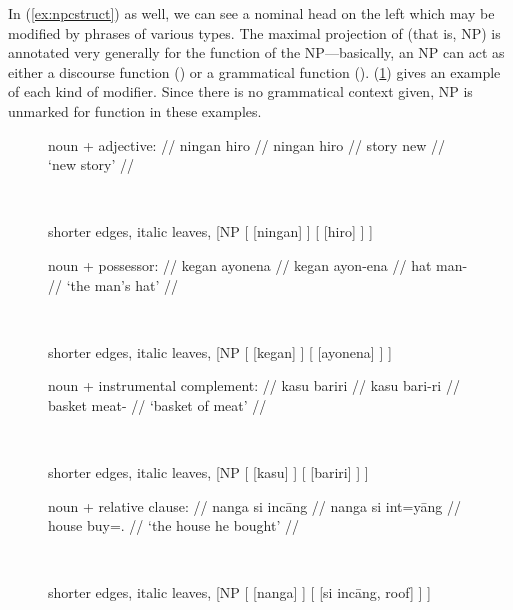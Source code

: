 In (\ref{ex:npcstruct}) as well, we can see a nominal head on the left which
may be modified by phrases of various types. The maximal projection of
 (that is, NP) is annotated very generally for the function of the
NP---basically, an NP can act as either a discourse function (\DF{}) or a
grammatical function (\GF{}). (\ref{ex:nounmods}) gives an example of each kind
of modifier. Since there is no grammatical context given, NP is unmarked for
function in these examples.

\begin{figure}
\pex\label{ex:nounmods}
\a %
	\begin{minipage}[t]{.5\remaining}
	\begingl
		\glpreamble noun + adjective: //
		\gla ningan hiro //
		\glb ningan hiro //
		\glc story new //
		\glft `new story' //
	\endgl
	\end{minipage}
	~
	\begin{forest} shorter edges, italic leaves,
	[NP
			[
				[{ningan}]
			]
			[{}
				[hiro]
			]
	]
	\end{forest}

\a %
	\begin{minipage}[t]{.5\remaining}
	\begingl
		\glpreamble noun + possessor: //
		\gla kegan ayonena //
		\glb kegan ayon-ena //
		\glc hat man-\Gen{} //
		\glft `the man's hat' //
	\endgl
	\end{minipage}
	~
	\begin{forest} shorter edges, italic leaves,
	[NP
			[
				[{kegan}]
			]
			[{}
				[ayonena]
			]
	]
	\end{forest}

\a %
	\begin{minipage}[t]{.5\remaining}
	\begingl
		\glpreamble noun + instrumental complement: //
		\gla kasu bariri //
		\glb kasu bari-ri //
		\glc basket meat-\Ins{} //
		\glft `basket of meat' //
	\endgl
	\end{minipage}
	~
	\begin{forest} shorter edges, italic leaves,
	[NP
			[
				[{kasu}]
			]
			[{}
				[bariri]
			]
	]
	\end{forest}

\a %
	\begin{minipage}[t]{.5\remaining}
	\begingl
		\glpreamble noun + relative clause: //
		\gla nanga si incāng //
		\glb nanga si int=yāng //
		\glc house \Rel{} buy=\TsgM{}.\Aarg{} //
		\glft `the house he bought' //
	\endgl
	\end{minipage}
	~
	\begin{forest} shorter edges, italic leaves,
	[NP
			[
				[{nanga}]
			]
			[{}
				[{si incāng}, roof]
			]
	]
	\end{forest}

\xe
\end{figure}

